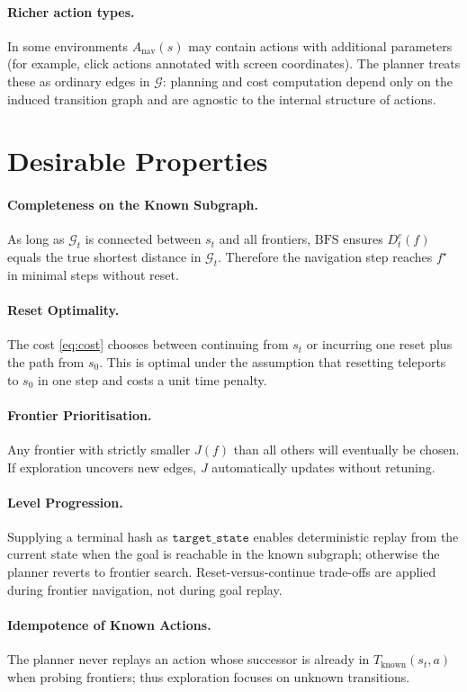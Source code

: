 \documentclass[11pt]{article}
\begin{document}
\paragraph{Richer action types.}
In some environments $A_{\mathrm{nav}}(s)$ may contain actions with additional
parameters (for example, click actions annotated with screen coordinates).
The planner treats these as ordinary edges in $\mathcal{G}$: planning and
cost computation depend only on the induced transition graph and are agnostic
to the internal structure of actions.

\section{Desirable Properties}

\paragraph{Completeness on the Known Subgraph.} As long as $\mathcal{G}_t$ is connected between $s_t$ and all frontiers, $\mathrm{BFS}$ ensures $D_t^{c}(f)$ equals the true shortest distance in $\mathcal{G}_t$. Therefore the navigation step reaches $f^\star$ in minimal steps without reset.

\paragraph{Reset Optimality.} The cost \eqref{eq:cost} chooses between continuing from $s_t$ or incurring one reset plus the path from $s_0$. This is optimal under the assumption that resetting teleports to $s_0$ in one step and costs a unit time penalty.

\paragraph{Frontier Prioritisation.} Any frontier with strictly smaller $J(f)$ than all others will eventually be chosen. If exploration uncovers new edges, $J$ automatically updates without retuning.

\paragraph{Level Progression.} Supplying a terminal hash as $\texttt{target\_state}$ enables deterministic replay from the current state when the goal is reachable in the known subgraph; otherwise the planner reverts to frontier search. Reset-versus-continue trade-offs are applied during frontier navigation, not during goal replay.

\paragraph{Idempotence of Known Actions.} The planner never replays an action whose successor is already in $T_{\mathrm{known}}(s_t, a)$ when probing frontiers; thus exploration focuses on unknown transitions.
\end{document}
